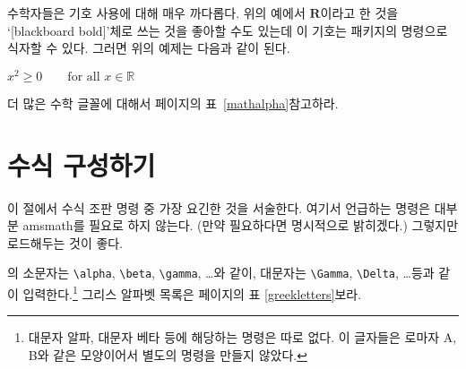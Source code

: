 수학자들은 기호 사용에 대해 매우 까다롭다. 위의 예에서 $\mathbf{R}$이라고 한 것을 `[blackboard bold]'체로 
쓰는 것을 좋아할 수도 있는데 이 기호는  패키지의  명령으로 식자할 수 있다.
그러면 위의 예제는 다음과 같이 된다.
\begin{example}
$x^{2} \geq 0\qquad
 \text{for all } x 
 \in \mathbb{R}$
\end{example}
더 많은 수학 글꼴에 대해서 \pageref{mathalpha}페이지의 표~\ref{mathalpha}\를 참고하라.


\section{수식 구성하기}

이 절에서 수식 조판 명령 중 가장 요긴한 것을 서술한다. 여기서 언급하는 명령은 대부분 \textsf{amsmath}를 
필요로 하지 않는다. (만약 필요하다면 명시적으로 밝히겠다.) 그렇지만 로드해두는 것이 좋다.

의 소문자는 \verb|\alpha|, \verb|\beta|, \verb|\gamma|, \ldots 와 같이,
대문자는 \verb|\Gamma|, \verb|\Delta|, \ldots 등과 같이 입력한다.\footnote{대문자 알파, 대문자 베타 등에 해당하는 명령은 따로 없다. 이 글자들은 로마자 A, B와 같은 모양이어서 별도의 명령을 만들지 않았다.}
그리스 알파벳 목록은 \pageref{greekletters}페이지의 표 \ref{greekletters}\를 보라.

